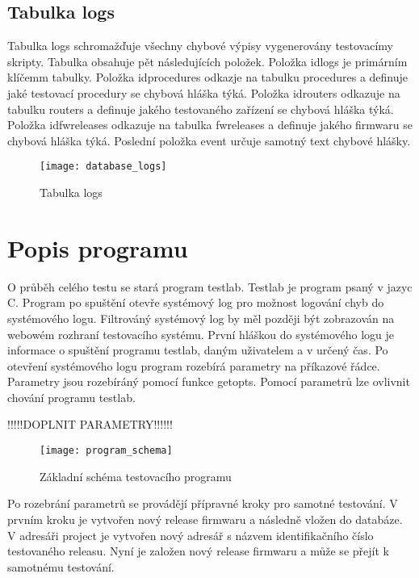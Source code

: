 \subsection{Tabulka logs}
Tabulka logs schromažďuje všechny chybové výpisy vygenerovány testovacímy skripty. Tabulka obsahuje pět následujících položek. Položka idlogs je primárním klíčemm tabulky. Položka idprocedures odkazje na tabulku procedures a definuje jaké testovací procedury se chybová hláška týká. Položka idrouters odkazuje na tabulku routers a definuje jakého testovaného zařízení se chybová hláška týká. Položka idfwreleases odkazuje na tabulka fwreleases a definuje jakého firmwaru se chybová hláška týká. Poslední položka event určuje samotný text chybové hlášky.

\begin{figure}[h]
  \centering
  \texttt{[image: database\_logs]}
  \caption{Tabulka logs}
  \label{fig:database_logs}
\end{figure}

\section{Popis programu}

O průběh celého testu se stará program testlab. Testlab je program psaný v jazyc C. Program po spuštění otevře systémový log pro možnost logování chyb do systémového logu. Filtrováný systémový log by měl později být zobrazován na webowém rozhraní testovacího systému. První hláškou do systémového logu je informace o spuštění programu testlab, daným uživatelem a v určený čas. Po otevření systémového logu program rozebírá parametry na příkazové řádce. Parametry jsou rozebíráný pomocí funkce getopts. Pomocí parametrů lze ovlivnit chování programu testlab.

!!!!!DOPLNIT PARAMETRY!!!!!!

\begin{figure}[h]
  \centering
  \texttt{[image: program\_schema]}
  \caption{Základní schéma testovacího programu}
  \label{fig:program_schema}
\end{figure}

Po rozebrání parametrů se provádějí přípravné kroky pro samotné testování. V prvním kroku je vytvořen nový release firmwaru a následně vložen do databáze. V adresáři project je vytvořen nový adresář s názvem identifikačního číslo testovaného releasu. Nyní je založen nový release firmwaru a může se přejít k samotnému testování.

